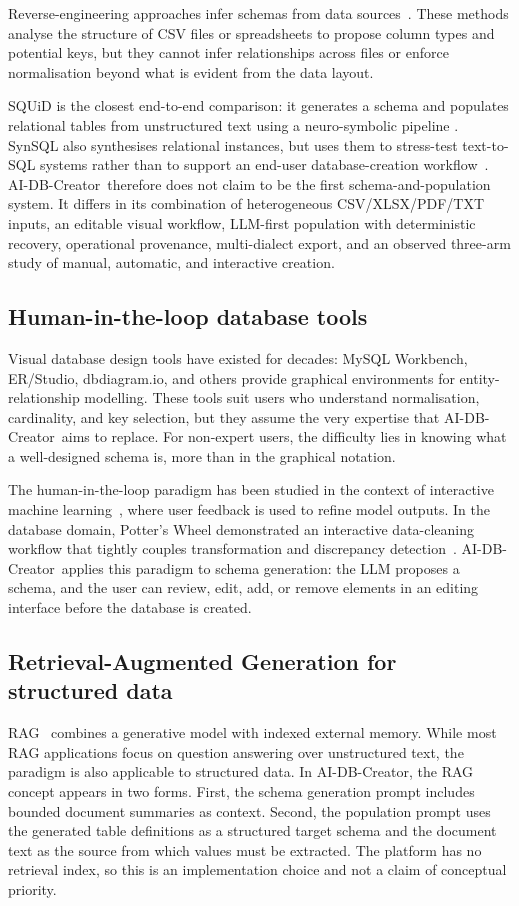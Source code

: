 \documentclass[11pt,a4paper]{article}
\newcommand{\aidb}{AI-DB-Creator}
\begin{document}
Reverse-engineering approaches infer schemas from data sources~\citep{rahm2001schema}. These methods analyse the structure of CSV files or spreadsheets to propose column types and potential keys, but they cannot infer relationships across files or enforce normalisation beyond what is evident from the data layout.

SQUiD is the closest end-to-end comparison: it generates a schema and populates
relational tables from unstructured text using a neuro-symbolic pipeline
\citep{sadia2025squid}. SynSQL also synthesises relational instances, but uses
them to stress-test text-to-SQL systems rather than to support an end-user
database-creation workflow~\citep{habibollah2026synsql}. \aidb\ therefore does
not claim to be the first schema-and-population system. It differs in its
combination of heterogeneous CSV/XLSX/PDF/TXT inputs, an editable visual
workflow, LLM-first population with deterministic recovery, operational provenance, multi-dialect
export, and an observed three-arm study of manual, automatic, and interactive
creation.

\subsection{Human-in-the-loop database tools}
Visual database design tools have existed for decades: MySQL Workbench, ER/Studio, dbdiagram.io, and others provide graphical environments for entity-relationship modelling. These tools suit users who understand normalisation, cardinality, and key selection, but they assume the very expertise that \aidb\ aims to replace. For non-expert users, the difficulty lies in knowing what a well-designed schema is, more than in the graphical notation.

The human-in-the-loop paradigm has been studied in the context of interactive machine learning~\citep{fails2003interactive,amershi2014power}, where user feedback is used to refine model outputs. In the database domain, Potter's Wheel demonstrated an interactive data-cleaning workflow that tightly couples transformation and discrepancy detection~\citep{raman2001potter}. \aidb\ applies this paradigm to schema generation: the LLM proposes a schema, and the user can review, edit, add, or remove elements in an editing interface before the database is created.

\subsection{Retrieval-Augmented Generation for structured data}
RAG~\citep{lewis2020rag} combines a generative model with indexed external memory. While most RAG applications focus on question answering over unstructured text, the paradigm is also applicable to structured data. In \aidb, the RAG concept appears in two forms. First, the schema generation prompt includes bounded document summaries as context. Second, the population prompt uses the generated table definitions as a structured target schema and the document text as the source from which values must be extracted. The platform has no retrieval index, so this is an implementation choice and not a claim of conceptual priority.
\end{document}
